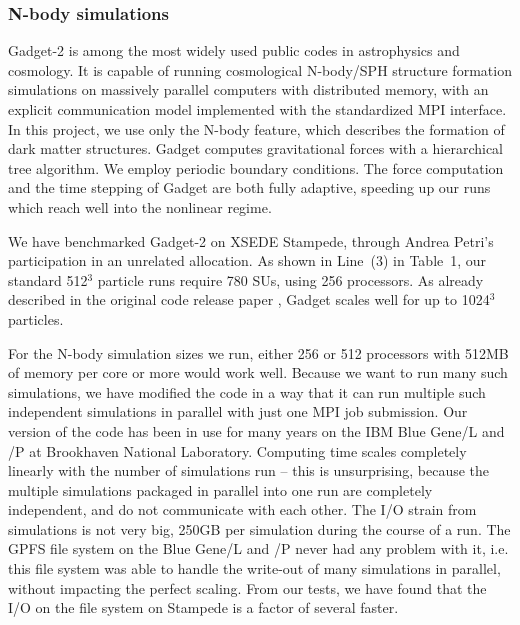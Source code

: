 \documentclass[10pt, preprint]{aastex}
\begin{document}
\subsubsection{N-body simulations}

Gadget-2 is among the most widely used public codes in astrophysics
and cosmology.  It is capable of running cosmological N-body/SPH
structure formation simulations on massively parallel computers with
distributed memory, with an explicit communication model implemented
with the standardized MPI interface.  In this project, we use only the
N-body feature, which describes the formation of dark matter
structures.  Gadget computes gravitational forces with a hierarchical
tree algorithm.  We employ periodic boundary conditions.  The force
computation and the time stepping of Gadget are both fully adaptive,
speeding up our runs which reach well into the nonlinear regime.

We have benchmarked Gadget-2 on XSEDE Stampede, through Andrea Petri's
participation in an unrelated allocation.
As shown in Line~(3) in Table~1, our standard 512$^3$ particle runs
require 780 SUs, using 256 processors.  As already described in the
original code release paper \cite{VS05}, Gadget scales well for up to
1024$^3$ particles.

For the N-body simulation sizes we run, either 256 or 512 processors
with 512MB of memory per core or more would work well. Because we want
to run many such simulations, we have modified the code in a way that
it can run multiple such independent simulations in parallel with just
one MPI job submission. Our version of the code has been in use for
many years on the IBM Blue Gene/L and /P at Brookhaven National
Laboratory.  Computing time scales completely linearly with the number
of simulations run -- this is unsurprising, because the multiple
simulations packaged in parallel into one run are completely
independent, and do not communicate with each other.  The I/O strain
from simulations is not very big, 250GB per simulation during the
course of a run. The GPFS file system on the Blue Gene/L and /P never
had any problem with it, i.e. this file system was able to handle the
write-out of many simulations in parallel, without impacting the
perfect scaling.  From our tests, we have found that the I/O on the
file system on Stampede is a factor of several faster.
\end{document}
